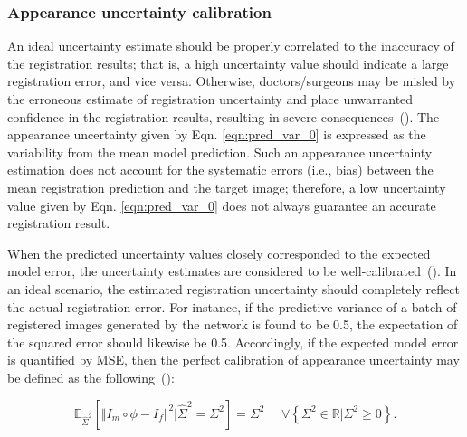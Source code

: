 \documentclass[times,twocolumn,final]{elsarticle}
\begin{document}
\subsubsection{Appearance uncertainty calibration}
\label{sec:uncert_cal}
An ideal uncertainty estimate should be properly correlated to the inaccuracy of the registration results; that is, a high uncertainty value should indicate a large registration error, and vice versa. Otherwise, doctors/surgeons may be misled by the erroneous estimate of registration uncertainty and place unwarranted confidence in the registration results, resulting in severe consequences~(\cite{luo2019applicability, risholm2013bayesian, risholm2011estimation}). The appearance uncertainty given by Eqn. \ref{eqn:pred_var_0} is expressed as the variability from the mean model prediction. Such an appearance uncertainty estimation does not account for the systematic errors (i.e., bias) between the mean registration prediction and the target image; therefore, a low uncertainty value given by Eqn. \ref{eqn:pred_var_0} does not always guarantee an accurate registration result.

When the predicted uncertainty values closely corresponded to the expected model error, the uncertainty estimates are considered to be well-calibrated~(\cite{laves2019well, levi2019evaluating}). In an ideal scenario, the estimated registration uncertainty should completely reflect the actual registration error. For instance, if the predictive variance of a batch of registered images generated by the network is found to be 0.5, the expectation of the squared error should likewise be 0.5. Accordingly, if the expected model error is quantified by MSE, then the perfect calibration of appearance uncertainty may be defined as the following~(\cite{guo2017calibration,levi2019evaluating, laves2020uncertainty}):
\begin{linenomath}
\begin{equation}
    \mathbb{E}_{\hat{\Sigma}^2}\left[\Vert I_m\circ\phi-I_f\Vert^2|\hat{\Sigma}^2=\Sigma^2\right]=\Sigma^2\ \ \ \ \ \ \forall\left\{\Sigma^2\in\mathbb{R} \vert \Sigma^2\geq0\right\}.
\end{equation}
\end{linenomath}
\end{document}
